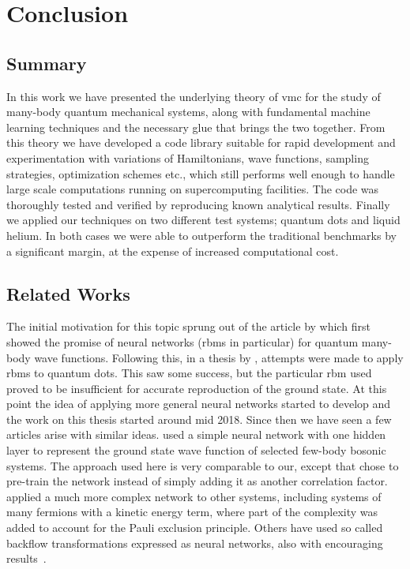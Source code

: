 \documentclass[Thesis.tex]{subfiles}
\begin{document}
\chapter{Conclusion}
\label{chp:conclusion}

\glsresetall

\section{Summary}

In this work we have presented the underlying theory of \gls{vmc}
for the study of many-body quantum mechanical systems, along
with fundamental machine learning techniques and the necessary glue that
brings the two together. From this theory we have developed a code
library suitable for rapid development and experimentation with
variations of Hamiltonians, wave functions, sampling strategies,
optimization schemes etc., which still performs well enough to
handle large scale computations running on supercomputing facilities. The
code was thoroughly tested and verified by reproducing known analytical
results. Finally we applied our techniques on two different test
systems; quantum dots and liquid helium. In both cases we were able to
outperform the traditional benchmarks by a significant margin, at the
expense of increased computational cost.


\section{Related Works}

The initial motivation for this topic sprung out of the article by
\textcite{Carleo602} which first showed the promise of neural networks
(\glspl{rbm} in particular) for quantum many-body wave functions. Following
this, in a thesis by \textcite{Flugsrud-2018}, attempts were made to apply
\glspl{rbm} to quantum dots. This saw some success, but the particular \gls{rbm}
used proved to be insufficient for accurate reproduction of the ground state. At
this point the idea of applying more general neural networks started to develop
and the work on this thesis started around mid 2018. Since then we have seen a
few articles arise with similar ideas. \textcite{Saito-2018} used a simple
neural network with one hidden layer to represent the ground state wave function
of selected few-body bosonic systems. The approach used here is very comparable
to our, except that \citeauthor{Saito-2018} chose to pre-train the network
instead of simply adding it as another correlation factor. \textcite{Han-2018}
applied a much more complex network to other systems, including systems of many
fermions with a kinetic energy term, where part of the complexity was added to
account for the Pauli exclusion principle. Others have used so called backflow
transformations expressed as neural networks, also with encouraging
results~\cite{ruggeri2018,Luo-2019}.
\end{document}
